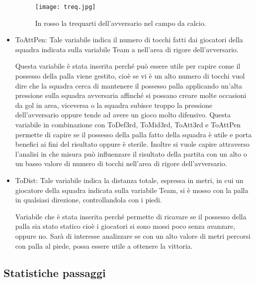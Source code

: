 \begin{itemize}
	\begin{figure}[!ht]
		\begin{center}
			\texttt{[image: treq.jpg]}
			\caption{In rosso la trequarti dell'avversario nel campo da calcio.} 
			\label{fig:treq}
		\end{center}
	\end{figure}
	
	\item \textsf{ToAttPen}: Tale variabile indica il numero di tocchi fatti dai giocatori della squadra indicata sulla variabile \textsf{Team} a nell'area di rigore dell'avversario. 
	
	Questa variabile è stata inserita perché può essere utile per capire come il possesso della palla viene gestito, cioè se vi è un alto numero di tocchi vuol dire che la squadra cerca di mantenere il possesso palla applicando un'alta pressione sulla squadra avversaria affinché si possano creare molte occasioni da gol in area, viceversa o la squadra subisce troppo la pressione dell'avversario oppure tende ad avere un gioco molto difensivo. Questa variabile in combinazione con \textsf{ToDef3rd}, \textsf{ToMid3rd}, \textsf{ToAtt3rd} e \textsf{ToAttPen} permette di capire se il possesso della palla fatto della squadra è utile e porta benefici ai fini del risultato oppure è sterile. Inoltre si vuole capire attraverso l'analisi in che misura può influenzare il risultato della partita con un alto o un basso valore di numero di tocchi nell'area di rigore dell'avversario.
	
	\item \textsf{ToDist}: Tale variabile indica la distanza totale, espressa in metri, in cui un giocatore della squadra indicata sulla variabile \textsf{Team}, si è mosso con la palla in qualsiasi direzione, controllandola con i piedi.
	
	Variabile che è stata inserita perché permette di ricavare se il possesso della palla sia stato statico cioè i giocatori si sono mossi poco senza avanzare, oppure no. Sarà di interesse analizzare se con un alto valore di metri percorsi con palla al piede, possa essere utile a ottenere la vittoria.

\end{itemize}

\subsection{Statistiche passaggi}

